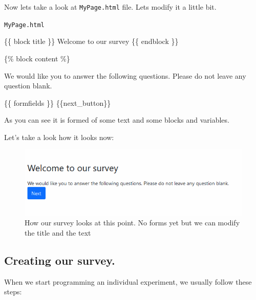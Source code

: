 \documentclass[
  letterpaper,
  DIV=11,
  numbers=noendperiod]{scrreprt}
\newenvironment{Shaded}{\begin{snugshade}}{\end{snugshade}}
\newcommand{\NormalTok}[1]{\textcolor[rgb]{0.00,0.23,0.31}{#1}}
\begin{document}
Now lets take a look at \texttt{MyPage.html} file. Lets modify it a
little bit.

\begin{codelisting}

\caption{\texttt{MyPage.html}}

\begin{Shaded}
\begin{Highlighting}[]
\NormalTok{\{\{ block title \}\}}
\NormalTok{Welcome to our survey }
\NormalTok{\{\{ endblock \}\}}

\NormalTok{\{\% block content \%\}}

\NormalTok{    We would like you to answer the following questions. }
\NormalTok{    Please do not leave any question blank.}

\NormalTok{   \{\{ formfields \}\}}
\NormalTok{   \{\{next\_button\}\}}
\end{Highlighting}
\end{Shaded}

\end{codelisting}

As you can see it is formed of some text and some blocks and variables.

Let's take a look how it looks now:

\begin{figure}

{\centering \includegraphics{part_otree/survey_firstlook.png}

}

\caption{\label{fig-survey-firstlook}How our survey looks at this point.
No forms yet but we can modify the title and the text}

\end{figure}

\hypertarget{creating-our-survey.}{%
\subsection{Creating our survey.}\label{creating-our-survey.}}

When we start programming an individual experiment, we usually follow
these steps:
\end{document}
